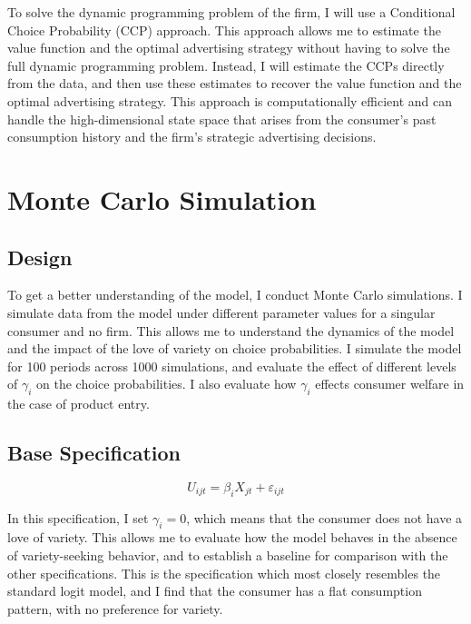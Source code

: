 \documentclass[12pt]{article}
\begin{document}
      To solve the dynamic programming problem of the firm, I will use a Conditional Choice Probability (CCP) approach. This approach allows me to estimate the value function and the optimal advertising strategy without having to solve the full dynamic programming problem. Instead, I will estimate the CCPs directly from the data, and then use these estimates to recover the value function and the optimal advertising strategy. This approach is computationally efficient and can handle the high-dimensional state space that arises from the consumer's past consumption history and the firm's strategic advertising decisions.

\section{Monte Carlo Simulation}

    \subsection{Design}
    To get a better understanding of the model, I conduct Monte Carlo simulations. I simulate data from the model under different parameter values for a singular consumer and no firm. This allows me to understand the dynamics of the model and the impact of the love of variety on choice probabilities. I simulate the model for 100 periods across 1000 simulations, and evaluate the effect of different levels of $\gamma_i$ on the choice probabilities. I also evaluate how $\gamma_i$ effects consumer welfare in the case of product entry.

    \subsection{Base Specification}

    \begin{equation}
      U_{ijt} = \beta_i X_{jt} + \varepsilon_{ijt}
    \end{equation}

    In this specification, I set $\gamma_i = 0$, which means that the consumer does not have a love of variety. This allows me to evaluate how the model behaves in the absence of variety-seeking behavior, and to establish a baseline for comparison with the other specifications. This is the specification which most closely resembles the standard logit model, and I find that the consumer has a flat consumption pattern, with no preference for variety.
\end{document}
